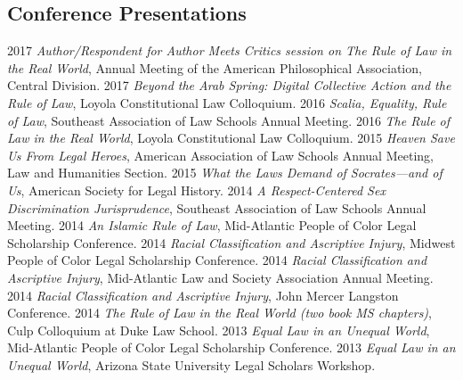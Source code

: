 \documentclass[letterpaper]{moderncv}
\begin{document}
\subsection{Conference Presentations}
\cvitem
{2017}
{\textit{Author/Respondent for Author Meets Critics session on The Rule of Law in the Real World}, Annual Meeting of the American Philosophical Association, Central Division.}
\vspace{1mm}
\cvitem
{2017}
{\textit{Beyond the Arab Spring: Digital Collective Action and the Rule of Law}, Loyola Constitutional Law Colloquium.}
\vspace{1mm}
\cvitem
{2016}
{\textit{Scalia, Equality, Rule of Law}, Southeast Association of Law Schools Annual Meeting.}
\vspace{1mm}
\cvitem
{2016}
{\textit{The Rule of Law in the Real World}, Loyola Constitutional Law Colloquium.}
\vspace{1mm}
\cvitem
{2015}
{\textit{Heaven Save Us From Legal Heroes}, American Association of Law Schools Annual Meeting, Law and Humanities Section.}
\vspace{1mm}
\cvitem
{2015}
{\textit{What the Laws Demand of Socrates---and of Us}, American Society for Legal History.}
\vspace{1mm}
\cvitem
{2014}
{\textit{A Respect-Centered Sex Discrimination Jurisprudence}, Southeast Association of Law Schools Annual Meeting.}
\vspace{1mm}
\cvitem
{2014}
{\textit{An Islamic Rule of Law}, Mid-Atlantic People of Color Legal Scholarship Conference.}
\vspace{1mm}
\cvitem
{2014}
{\textit{Racial Classification and Ascriptive Injury}, Midwest People of Color Legal Scholarship Conference.}
\vspace{1mm}
\cvitem
{2014}
{\textit{Racial Classification and Ascriptive Injury}, Mid-Atlantic Law and Society Association Annual Meeting.}
\vspace{1mm}
\cvitem
{2014}
{\textit{Racial Classification and Ascriptive Injury}, John Mercer Langston Conference.}
\vspace{1mm}
\cvitem
{2014}
{\textit{The Rule of Law in the Real World (two book MS chapters)}, Culp Colloquium at Duke Law School.}
\vspace{1mm}
\cvitem
{2013}
{\textit{Equal Law in an Unequal World}, Mid-Atlantic People of Color Legal Scholarship Conference.}
\vspace{1mm}
\cvitem
{2013}
{\textit{Equal Law in an Unequal World}, Arizona State University Legal Scholars Workshop.}
\end{document}

